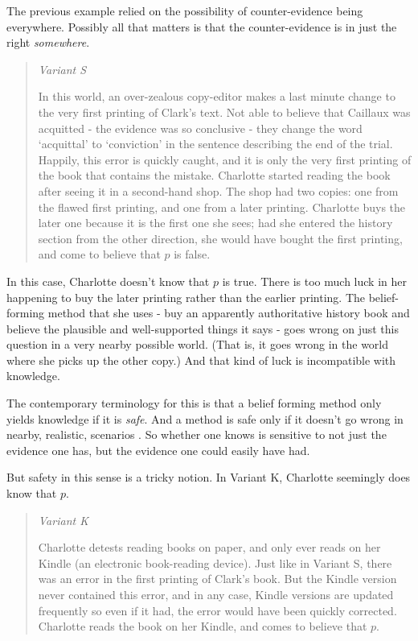 \documentclass[11pt,]{book}
\begin{document}
The previous example relied on the possibility of counter-evidence being everywhere. Possibly all that matters is that the counter-evidence is in just the right \emph{somewhere}.

\begin{quote}
\emph{Variant S}

In this world, an over-zealous copy-editor makes a last minute change to the very first printing of Clark's text. Not able to believe that Caillaux was acquitted - the evidence was so conclusive - they change the word `acquittal' to `conviction' in the sentence describing the end of the trial. Happily, this error is quickly caught, and it is only the very first printing of the book that contains the mistake. Charlotte started reading the book after seeing it in a second-hand shop. The shop had two copies: one from the flawed first printing, and one from a later printing. Charlotte buys the later one because it is the first one she sees; had she entered the history section from the other direction, she would have bought the first printing, and come to believe that \(p\) is false.
\end{quote}

In this case, Charlotte doesn't know that \(p\) is true. There is too much luck in her happening to buy the later printing rather than the earlier printing. The belief-forming method that she uses - buy an apparently authoritative history book and believe the plausible and well-supported things it says - goes wrong on just this question in a very nearby possible world. (That is, it goes wrong in the world where she picks up the other copy.) And that kind of luck is incompatible with knowledge.

The contemporary terminology for this is that a belief forming method only yields knowledge if it is \emph{safe}. And a method is safe only if it doesn't go wrong in nearby, realistic, scenarios \citep{Williamson2000}. So whether one knows is sensitive to not just the evidence one has, but the evidence one could easily have had.

But safety in this sense is a tricky notion. In Variant K, Charlotte seemingly does know that \(p\).

\begin{quote}
\emph{Variant K}

Charlotte detests reading books on paper, and only ever reads on her Kindle (an electronic book-reading device). Just like in Variant S, there was an error in the first printing of Clark's book. But the Kindle version never contained this error, and in any case, Kindle versions are updated frequently so even if it had, the error would have been quickly corrected. Charlotte reads the book on her Kindle, and comes to believe that \(p\).
\end{quote}
\end{document}
